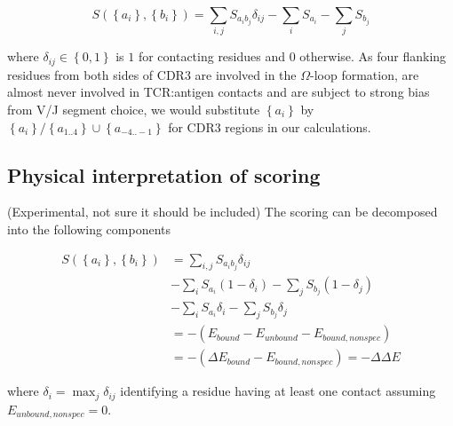 \documentclass{article}
\begin{document}
\begin{equation}
S\left(\left\{a_i\right\},\left\{b_i\right\}\right)=\sum_{i,j} S_{a_{i}b_{j}} \delta_{ij} - \sum_{i} S_{a_{i}} - \sum_{j} S_{b_{j}}
\end{equation}

where $\delta_{ij} \in \left\{0, 1\right\}$ is $1$ for contacting residues and $0$ otherwise. As four flanking residues from both sides of CDR3 are involved in the $\Omega$-loop formation, are almost never involved in TCR:antigen contacts and are subject to strong bias from V/J segment choice, we would substitute $\left\{a_i\right\}$ by $\left\{a_i\right\} / \left\{a_{1..4}\right\} \cup \left\{a_{-4..-1}\right\}$ for CDR3 regions in our calculations.

\subsection{Physical interpretation of scoring}

(Experimental, not sure it should be included) The scoring can be decomposed into the following components

\begin{align}
S\left(\left\{a_i\right\},\left\{b_i\right\}\right) &= \sum_{i,j} S_{a_{i}b_{j}} \delta_{ij} \\ &- \sum_{i} S_{a_{i}} \left(1 - \delta_i\right) - \sum_{j} S_{b_{j}} \left(1 - \delta_j\right) \\ &- \sum_{i} S_{a_{i}} \delta_i - \sum_{j} S_{b_{j}} \delta_j \\
 &= -\left(E_{bound} - E_{unbound} - E_{bound,nonspec}\right) \\
 &= -\left(\Delta E_{bound} - E_{bound,nonspec}\right) = -\Delta \Delta E
\end{align}

where $\delta_i = \max_{j} \delta_{ij}$ identifying a residue having at least one contact assuming $E_{unbound,nonspec}=0$.
\end{document}
